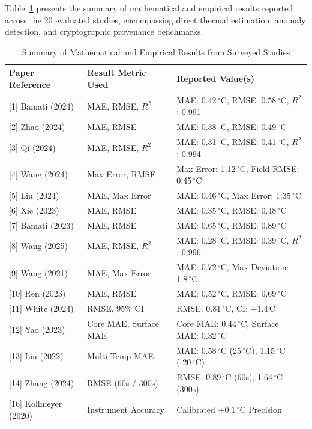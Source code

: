 \documentclass[conference]{IEEEtran}
\begin{document}
Table~\ref{tab:results} presents the summary of mathematical and empirical results reported across the 20 evaluated studies, encompassing direct thermal estimation, anomaly detection, and cryptographic provenance benchmarks.

\begin{table}[htbp]
\caption{Summary of Mathematical and Empirical Results from Surveyed Studies}
\label{tab:results}
\centering
\scriptsize
\begin{tabular}{@{}lll@{}}
\toprule
\textbf{Paper Reference} & \textbf{Result Metric Used} & \textbf{Reported Value(s)} \\ \midrule
{[1] Bamati (2024)} & MAE, RMSE, $R^2$ & MAE: 0.42\,$^\circ$C, RMSE: 0.58\,$^\circ$C, $R^2$: 0.991 \\
{[2] Zhao (2024)} & MAE, RMSE & MAE: 0.38\,$^\circ$C, RMSE: 0.49\,$^\circ$C \\
{[3] Qi (2024)} & MAE, RMSE, $R^2$ & MAE: 0.31\,$^\circ$C, RMSE: 0.41\,$^\circ$C, $R^2$: 0.994 \\
{[4] Wang (2024)} & Max Error, RMSE & Max Error: 1.12\,$^\circ$C, Field RMSE: 0.45\,$^\circ$C \\
{[5] Liu (2024)} & MAE, Max Error & MAE: 0.46\,$^\circ$C, Max Error: 1.35\,$^\circ$C \\
{[6] Xie (2023)} & MAE, RMSE & MAE: 0.35\,$^\circ$C, RMSE: 0.48\,$^\circ$C \\
{[7] Bamati (2023)} & MAE, RMSE & MAE: 0.65\,$^\circ$C, RMSE: 0.89\,$^\circ$C \\
{[8] Wang (2025)} & MAE, RMSE, $R^2$ & MAE: 0.28\,$^\circ$C, RMSE: 0.39\,$^\circ$C, $R^2$: 0.996 \\
{[9] Wang (2021)} & MAE, Max Error & MAE: 0.72\,$^\circ$C, Max Deviation: 1.8\,$^\circ$C \\
{[10] Ren (2023)} & MAE, RMSE & MAE: 0.52\,$^\circ$C, RMSE: 0.69\,$^\circ$C \\
{[11] White (2024)} & RMSE, 95\% CI & RMSE: 0.81\,$^\circ$C, CI: $\pm 1.4\,$C \\
{[12] Yao (2023)} & Core MAE, Surface MAE & Core MAE: 0.44\,$^\circ$C, Surface MAE: 0.32\,$^\circ$C \\
{[13] Liu (2022)} & Multi-Temp MAE & MAE: 0.58\,$^\circ$C (25\,$^\circ$C), 1.15\,$^\circ$C (-20\,$^\circ$C) \\
{[14] Zhang (2024)} & RMSE (60s / 300s) & RMSE: 0.89\,$^\circ$C (60s), 1.64\,$^\circ$C (300s) \\
{[16] Kollmeyer (2020)} & Instrument Accuracy & Calibrated $\pm 0.1\,^\circ$C Precision \\ \midrule

\end{tabular}
\end{table}
\end{document}

